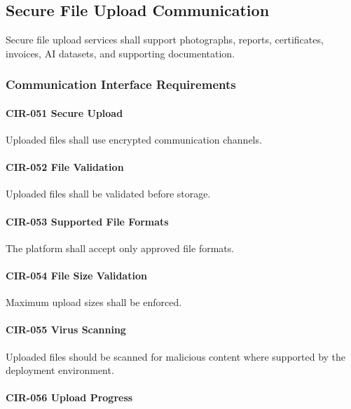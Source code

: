 \subsection{Secure File Upload Communication}

Secure file upload services shall support photographs, reports,
certificates, invoices, AI datasets, and supporting documentation.


\subsubsection*{Communication Interface Requirements}

\paragraph{CIR-051 Secure Upload}

Uploaded files shall use encrypted communication channels.

\paragraph{CIR-052 File Validation}

Uploaded files shall be validated before storage.

\paragraph{CIR-053 Supported File Formats}

The platform shall accept only approved file formats.

\paragraph{CIR-054 File Size Validation}

Maximum upload sizes shall be enforced.

\paragraph{CIR-055 Virus Scanning}

Uploaded files should be scanned for malicious content where supported
by the deployment environment.

\paragraph{CIR-056 Upload Progress}

